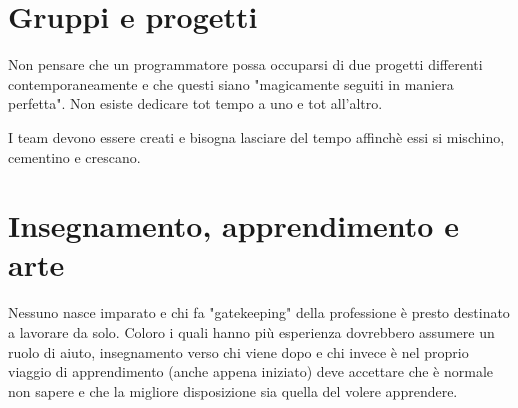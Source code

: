 \documentclass[11pt,a4paper]{book}
\begin{document}
\chapter{Gruppi e progetti}
Non pensare che un programmatore possa occuparsi di due progetti differenti contemporaneamente e che questi siano "magicamente seguiti in maniera perfetta". Non esiste dedicare tot tempo a uno e tot all'altro.

I team devono essere creati e bisogna lasciare del tempo affinchè essi si mischino, cementino e crescano.

\chapter{Insegnamento, apprendimento e arte}
Nessuno nasce imparato e chi fa "gatekeeping" della professione è presto destinato a lavorare da solo. Coloro i quali hanno più esperienza dovrebbero assumere un ruolo di aiuto, insegnamento verso chi viene dopo e chi invece è nel proprio viaggio di apprendimento (anche appena iniziato) deve accettare che è normale non sapere e che la migliore disposizione sia quella del volere apprendere.
\end{document}
